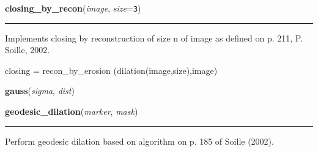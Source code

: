    \label{multireg:morph:closing_by_recon}
    \vspace{0.5ex}

    \begin{boxedminipage}{\textwidth}

    \raggedright \textbf{closing\_by\_recon}(\textit{image}, \textit{size}=\texttt{3\-})

    \vspace{-1.5ex}

    \rule{\textwidth}{0.5\fboxrule}
    Implements closing by reconstruction of size n of image as defined on 
    p. 211, P. Soille, 2002.

    closing = recon\_by\_erosion (dilation(image,size),image)

    \vspace{1ex}

    \end{boxedminipage}

    \label{multireg:morph:gauss}
    \vspace{0.5ex}

    \begin{boxedminipage}{\textwidth}

    \raggedright \textbf{gauss}(\textit{sigma}, \textit{dist})

    \end{boxedminipage}

    \label{multireg:morph:geodesic_dilation}
    \vspace{0.5ex}

    \begin{boxedminipage}{\textwidth}

    \raggedright \textbf{geodesic\_dilation}(\textit{marker}, \textit{mask})

    \vspace{-1.5ex}

    \rule{\textwidth}{0.5\fboxrule}
    Perform geodesic dilation based on algorithm on p. 185 of Soille 
    (2002).

    \vspace{1ex}

    \end{boxedminipage}

    \label{multireg:morph:geodesic_erosion}
    \vspace{0.5ex}

